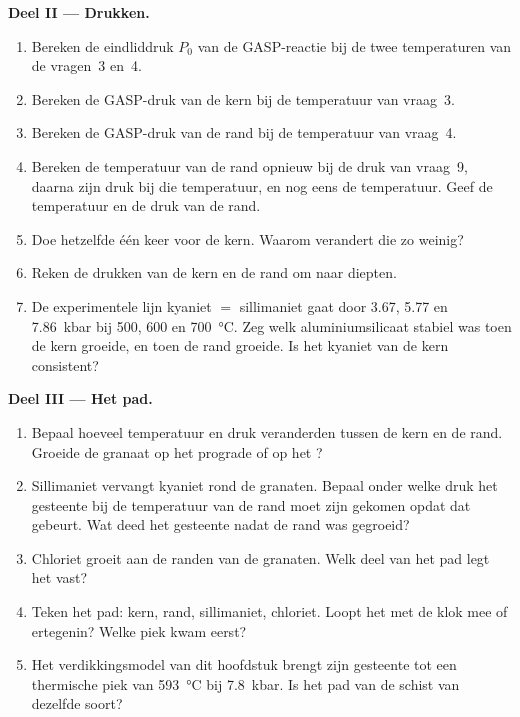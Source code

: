 \begin{problem}
\noindent\textbf{Deel II --- Drukken.}
\begin{enumerate}[resume]
\item Bereken de eindliddruk $P_0$ van de GASP-reactie bij de twee temperaturen
van de vragen~3 en~4.
\item Bereken de GASP-druk van de kern bij de temperatuur van vraag~3.
\item Bereken de GASP-druk van de rand bij de temperatuur van vraag~4.
\item Bereken de temperatuur van de rand opnieuw bij de druk van vraag~9, daarna zijn
druk bij die temperatuur, en nog eens de temperatuur. Geef de temperatuur en de druk
van de rand.
\item Doe hetzelfde één keer voor de kern. Waarom verandert die zo weinig?
\item Reken de drukken van de kern en de rand om naar diepten.
\item De experimentele lijn kyaniet $=$ sillimaniet gaat door 3.67, 5.77 en
\qty{7.86}{kbar} bij 500, 600 en \qty{700}{\celsius}. Zeg welk aluminiumsilicaat stabiel was
toen de kern groeide, en toen de rand groeide. Is het kyaniet van de kern consistent?
\end{enumerate}

\noindent\textbf{Deel III --- Het pad.}
\begin{enumerate}[resume]
\item Bepaal hoeveel temperatuur en druk veranderden tussen de kern en de rand.
Groeide de granaat op het prograde of op het ?
\item Sillimaniet vervangt kyaniet rond de granaten. Bepaal onder welke druk het gesteente bij de temperatuur van de rand
moet zijn gekomen opdat dat gebeurt. Wat deed het gesteente
nadat de rand was gegroeid?
\item Chloriet groeit aan de randen van de granaten. Welk deel van het pad legt het vast?
\item Teken het pad: kern, rand, sillimaniet, chloriet. Loopt het met de klok mee of ertegenin?
Welke piek kwam eerst?
\item Het verdikkingsmodel van dit hoofdstuk brengt zijn gesteente tot een thermische piek van
\qty{593}{\celsius} bij \qty{7.8}{kbar}. Is het pad van de schist van dezelfde soort?
\end{enumerate}


\end{problem}

